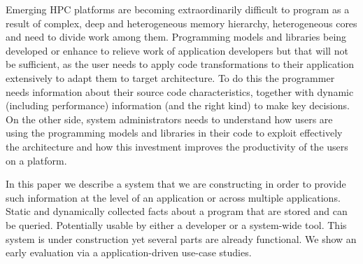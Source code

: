 Emerging HPC platforms are becoming extraordinarily difficult to program as a result of complex, deep  and heterogeneous memory hierarchy, heterogeneous cores and need to divide work among them. 
Programming models and libraries being developed or enhance to relieve work of application developers but that will not be sufficient, as the user needs to apply code transformations to their application extensively to adapt them to target architecture. To do this the programmer needs information about their source code characteristics, together with dynamic (including performance) information (and the right kind) to make key decisions.
On the other side, system administrators needs to understand how users are using the programming models and libraries in their code to exploit effectively the architecture and how this investment improves the productivity of the users on a platform.

In this paper we describe a system that we are constructing in order to provide such information at the level of an application or across multiple applications. Static and dynamically collected facts about a program that are stored and can be queried. Potentially usable by either a developer or a system-wide tool. This system is under construction yet several parts are already functional.  We show an early evaluation via a application-driven use-case studies.

